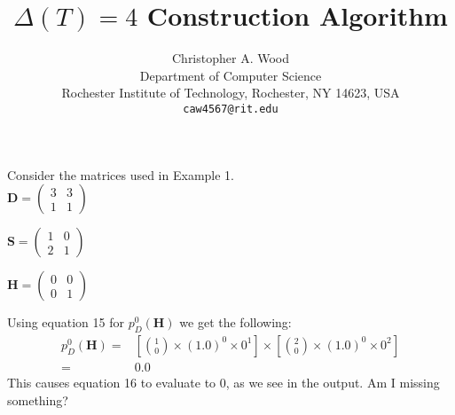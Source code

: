 \documentclass[12pt]{article}
\title{\bf $\Delta(T) = 4$ Construction Algorithm}
\author{
Christopher A. Wood\\
\small Department of Computer Science \\[-0.8ex]
\small Rochester Institute of Technology, Rochester, NY  14623, USA \\[-0.8ex]
\small \texttt{caw4567@rit.edu}\\
}
\date{\dateline{XX}{XX}}
\begin{document}
Consider the matrices used in Example 1. \\

$\mathbf{D} = 
\begin{pmatrix}
3 & 3 \\
1 & 1
\end{pmatrix}
$

$\mathbf{S} = 
\begin{pmatrix}
1 & 0 \\
2 & 1
\end{pmatrix}
$

$\mathbf{H} = 
\begin{pmatrix}
0 & 0 \\
0 & 1
\end{pmatrix}
$

Using equation 15 for $p_D^{0}(\mathbf{H})$ we get the following:
\begin{align*}
p_D^{0}(\mathbf{H}) = & [{1 \choose 0}\times(1.0)^0 \times 0^{1}] \times [{2 \choose 0}\times(1.0)^0 \times 0^{2}]\\
= & 0.0
\end{align*}
This causes equation 16 to evaluate to 0, as we see in the output. Am I missing something?
\end{document}

